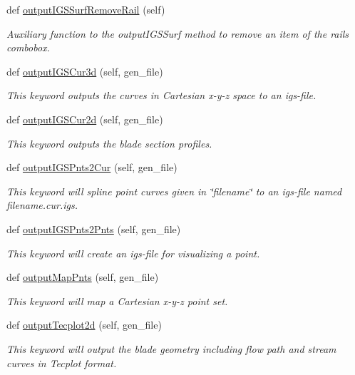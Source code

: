 \begin{DoxyCompactItemize}
def \hyperlink{a00073_ae5847a1434bc82a396cebfb20911db56}{output\+I\+G\+S\+Surf\+Remove\+Rail} (self)
\begin{DoxyCompactList}\small\item\em Auxiliary function to the output\+I\+G\+S\+Surf method to remove an item of the rails combobox. \end{DoxyCompactList}\item 
def \hyperlink{a00073_a394d61e8d66fde036f84746086d6c687}{output\+I\+G\+S\+Cur3d} (self, gen\+\_\+file)
\begin{DoxyCompactList}\small\item\em This keyword outputs the curves in Cartesian x-\/y-\/z space to an igs-\/file. \end{DoxyCompactList}\item 
def \hyperlink{a00073_ace84b07ce1416a3535068da6baa2e7d3}{output\+I\+G\+S\+Cur2d} (self, gen\+\_\+file)
\begin{DoxyCompactList}\small\item\em This keyword outputs the blade section profiles. \end{DoxyCompactList}\item 
def \hyperlink{a00073_a60dc6e0ccec5f096ee68f997079abef3}{output\+I\+G\+S\+Pnts2\+Cur} (self, gen\+\_\+file)
\begin{DoxyCompactList}\small\item\em This keyword will spline point curves given in \char`\"{}filename\char`\"{} to an igs-\/file named filename.\+cur.\+igs. \end{DoxyCompactList}\item 
def \hyperlink{a00073_a07862d0aa6332b54008342a24c2e30a3}{output\+I\+G\+S\+Pnts2\+Pnts} (self, gen\+\_\+file)
\begin{DoxyCompactList}\small\item\em This keyword will create an igs-\/file for visualizing a point. \end{DoxyCompactList}\item 
def \hyperlink{a00073_abfeabe3a35852a2ce2ddf16765aef7eb}{output\+Map\+Pnts} (self, gen\+\_\+file)
\begin{DoxyCompactList}\small\item\em This keyword will map a Cartesian x-\/y-\/z point set. \end{DoxyCompactList}\item 
def \hyperlink{a00073_a63d4bad24ed0fab617c1676db04a67e7}{output\+Tecplot2d} (self, gen\+\_\+file)
\begin{DoxyCompactList}\small\item\em This keyword will output the blade geometry including flow path and stream curves in Tecplot format. \end{DoxyCompactList}\item 

\end{DoxyCompactItemize}
